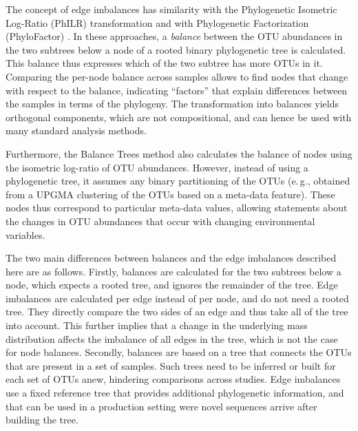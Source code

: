 
The concept of edge imbalances has similarity with
the Phylogenetic Isometric Log-Ratio (PhILR) transformation \cite{Silverman2017}
and with Phylogenetic Factorization (Phylo\-Factor) \cite{Washburne2017a}.
In these approaches, a \emph{balance} between the OTU abundances in the two subtrees below a node
of a rooted binary phylogenetic tree is calculated.
This balance thus expresses which of the two subtree has more OTUs in it.
Comparing the per-node balance across samples allows to find nodes that change with respect to the balance,
indicating ``factors'' that explain differences between the samples in terms of the phylogeny.
The transformation into balances yields orthogonal components, which are not compositional,
and can hence be used with many standard analysis methods.

Furthermore, the Balance Trees method \cite{Morton2017} also calculates
the balance of nodes using the isometric log-ratio of OTU abundances.
However, instead of using a phylogenetic tree, it assumes any binary partitioning of the OTUs
(e.\,g., obtained from a UPGMA clustering \cite{Legendre1998} of the OTUs based on a meta-data feature).
These nodes thus correspond to particular meta-data values,
allowing statements about the changes in OTU abundances that occur with changing environmental variables.

The two main differences between balances and the edge imbalances described here are as follows.
Firstly, balances are calculated for the two subtrees below a node,
which expects a rooted tree, and ignores the remainder of the tree.
Edge imbalances are calculated per edge instead of per node, and do not need a rooted tree.
They directly compare the two sides of an edge and thus take all of the tree into account.
This further implies that a change in the underlying mass distribution affects the imbalance of all edges in the tree,
which is not the case for node balances.
Secondly, balances are based on a tree that connects the OTUs that are present in a set of samples.
Such trees need to be inferred or built for each set of OTUs anew, hindering comparisons across studies.
Edge imbalances use a fixed reference tree that provides additional phylogenetic information,
and that can be used in a production setting were novel sequences arrive after building the tree.

